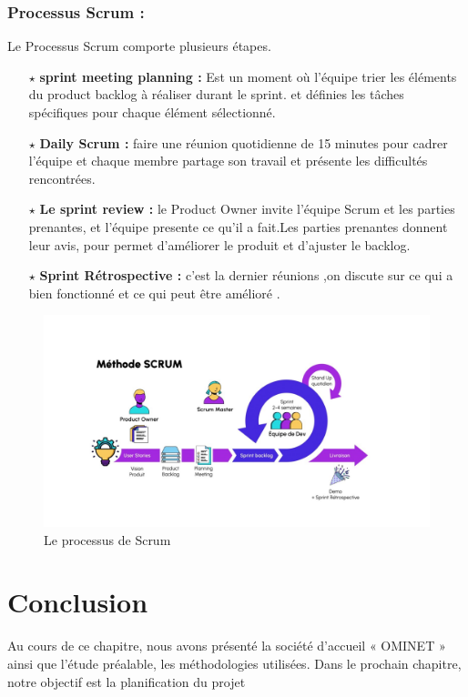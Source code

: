 \subsubsection{Processus Scrum : }
Le Processus Scrum comporte plusieurs étapes.
 \begin{itemize}
    \item[$\star$] \textbf{ sprint meeting planning : } Est un moment où l'équipe trier les éléments du product backlog à réaliser durant le sprint.
et définies les tâches spécifiques  pour chaque élément sélectionné.
      \item[$\star$] \textbf{ Daily Scrum : }  faire une réunion quotidienne de 15 minutes pour cadrer l'équipe et chaque membre partage son travail et  présente les difficultés rencontrées.
       \item[$\star$] \textbf{Le sprint review : } le Product Owner invite l’équipe Scrum et les parties prenantes, et l’équipe presente ce qu’il  a fait.Les parties prenantes donnent leur avis, pour permet d'améliorer le produit et d’ajuster le backlog.
        \item[$\star$] \textbf{Sprint Rétrospective : } c'est la dernier réunions ,on discute sur ce qui a bien fonctionné et ce qui peut être amélioré .
\end{itemize}
\begin{figure}[H]
    \centering
    \includegraphics[width=0.9\linewidth]{projet/images/diagramme de sequance/images/methodeScrum.jpg}
    \caption{ Le processus de Scrum}
    \label{fig:image_centree}
\end{figure}


\section*{Conclusion}
Au cours de ce chapitre, nous avons présenté la société d’accueil « OMINET » ainsi que l’étude préalable, les méthodologies utilisées.
Dans le prochain chapitre, notre objectif est la planification du projet
